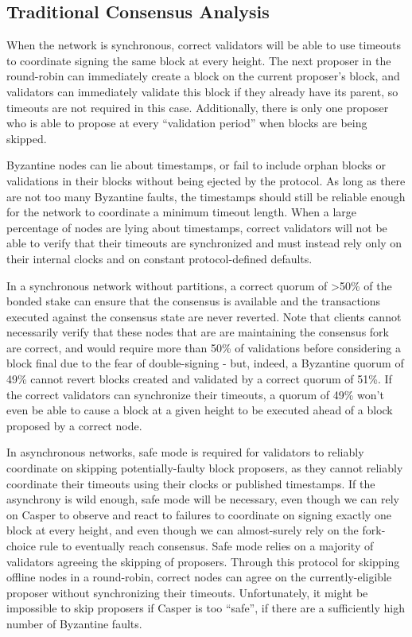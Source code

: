 \documentclass[11pt,a4paper]{article}
\begin{document}
\subsection{Traditional Consensus Analysis}


When the network is synchronous, correct validators will be able to use timeouts to coordinate signing the same block at every height. The next proposer in the round-robin can immediately create a block on the current proposer's block, and validators can immediately validate this block if they already have its parent, so timeouts are not required in this case. Additionally, there is only one proposer who is able to propose at every ``validation period'' when blocks are being skipped. 

Byzantine nodes can lie about timestamps, or fail to include orphan blocks or validations in their blocks without being ejected by the protocol. As long as there are not too many Byzantine faults, the timestamps should still be reliable enough for the network to coordinate a minimum timeout length. When a large percentage of nodes are lying about timestamps, correct validators will not be able to verify that their timeouts are synchronized and must instead rely only on their internal clocks and on constant protocol-defined defaults.

In a synchronous network without partitions, a correct quorum of >50\% of the bonded stake can ensure that the consensus is available and the transactions executed against the consensus state are never reverted. Note that clients cannot necessarily verify that these nodes that are are maintaining the consensus fork are correct, and would require more than 50\% of validations before considering a block final due to the fear of double-signing - but, indeed, a Byzantine quorum of 49\% cannot revert blocks created and validated by a correct quorum of 51\%. If the correct validators can synchronize their timeouts, a quorum of 49\% won't even be able to cause a block at a given height to be executed ahead of a block proposed by a correct node.

In asynchronous networks, safe mode is required for validators to reliably coordinate on skipping potentially-faulty block proposers, as they cannot reliably coordinate their timeouts using their clocks or published timestamps. If the asynchrony is wild enough, safe mode will be necessary, even though we can rely on Casper to observe and react to failures to coordinate on signing exactly one block at every height, and even though we can almost-surely rely on the fork-choice rule to eventually reach consensus. Safe mode relies on a majority of validators agreeing the skipping of proposers. Through this protocol for skipping offline nodes in a round-robin, correct nodes can agree on the currently-eligible proposer without synchronizing their timeouts. Unfortunately, it might be impossible to skip proposers if Casper is too ``safe'', if there are a sufficiently high number of Byzantine faults. 
\end{document}
